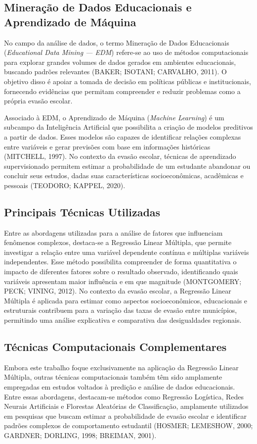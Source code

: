 \documentclass[english, spanish, brazilian]{RBIEarticle} %
\begin{document}
\subsection{Mineração de Dados Educacionais e Aprendizado de Máquina}
No campo da análise de dados, o termo Mineração de Dados Educacionais (\textit{Educational Data Mining — EDM}) refere-se ao uso de métodos computacionais para explorar grandes volumes de dados gerados em ambientes educacionais, buscando padrões relevantes (BAKER; ISOTANI; CARVALHO, 2011). O objetivo disso é apoiar a tomada de decisão em políticas públicas e institucionais, fornecendo evidências que permitam compreender e reduzir problemas como a própria evasão escolar.

Associado à EDM, o Aprendizado de Máquina (\textit{Machine Learning}) é um subcampo da Inteligência Artificial que possibilita a criação de modelos preditivos a partir de dados. Esses modelos são capazes de identificar relações complexas entre variáveis e gerar previsões com base em informações históricas (MITCHELL, 1997). No contexto da evasão escolar, técnicas de aprendizado supervisionado permitem estimar a probabilidade de um estudante abandonar ou concluir seus estudos, dadas suas características socioeconômicas, acadêmicas e pessoais (TEODORO; KAPPEL, 2020).

\subsection{Principais Técnicas Utilizadas}
Entre as abordagens utilizadas para a análise de fatores que influenciam fenômenos complexos, destaca-se a Regressão Linear Múltipla, que permite investigar a relação entre uma variável dependente contínua e múltiplas variáveis independentes. Esse método possibilita compreender de forma quantitativa o impacto de diferentes fatores sobre o resultado observado, identificando quais variáveis apresentam maior influência e em que magnitude (MONTGOMERY; PECK; VINING, 2012).
No contexto da evasão escolar, a Regressão Linear Múltipla é aplicada para estimar como aspectos socioeconômicos, educacionais e estruturais contribuem para a variação das taxas de evasão entre municípios, permitindo uma análise explicativa e comparativa das desigualdades regionais.

\subsection{Técnicas Computacionais Complementares}
Embora este trabalho foque exclusivamente na aplicação da Regressão Linear Múltipla, outras técnicas computacionais também têm sido amplamente empregadas em estudos voltados à predição e análise de dados educacionais. Entre essas abordagens, destacam-se métodos como Regressão Logística, Redes Neurais Artificiais e Florestas Aleatórias de Classificação, amplamente utilizados em pesquisas que buscam estimar a probabilidade de evasão escolar e identificar padrões complexos de comportamento estudantil (HOSMER; LEMESHOW, 2000; GARDNER; DORLING, 1998; BREIMAN, 2001).
\end{document}
